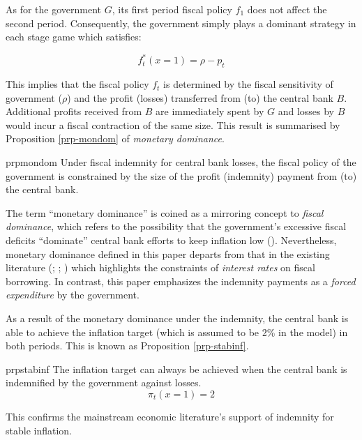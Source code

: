 \documentclass[
  a4paper,
  abstract=true]{scrartcl}
\theoremstyle{definition}
\begin{document}
As for the government \(G\), its first period fiscal policy \(f_1\) does
not affect the second period. Consequently, the government simply plays
a dominant strategy in each stage game which satisfies:

\[
f_t^*(x=1)=\rho-p_t
\]

This implies that the fiscal policy \(f_t\) is determined by the fiscal
sensitivity of government (\(\rho\)) and the profit (losses) transferred
from (to) the central bank \(B\). Additional profits received from \(B\)
are immediately spent by \(G\) and losses by \(B\) would incur a fiscal
contraction of the same size. This result is summarised by Proposition
\ref{prp-mondom} of \emph{monetary dominance}.

\begin{restatable}{prp}{mondom}
\label{prp-mondom}
Under fiscal indemnity for central bank losses, the fiscal policy of the government is constrained by the size of the profit (indemnity) payment from (to) the central bank.
\end{restatable}

The term ``monetary dominance'' is coined as a mirroring concept to
\emph{fiscal dominance}, which refers to the possibility that the
government's excessive fiscal deficits ``dominate'' central bank efforts
to keep inflation low ().
Nevertheless, monetary dominance defined in this paper departs from that
in the existing literature (;
;
) which
highlights the constraints of \emph{interest rates} on fiscal borrowing.
In contrast, this paper emphasizes the indemnity payments as a
\emph{forced expenditure} by the government.

As a result of the monetary dominance under the indemnity, the central
bank is able to achieve the inflation target (which is assumed to be 2\%
in the model) in both periods. This is known as Proposition
\ref{prp-stabinf}.

\begin{restatable}{prp}{stabinf}
\label{prp-stabinf}
The inflation target can always be achieved when the central bank is indemnified by the government against losses.
$$
\pi_t(x=1)=2
$$
\end{restatable}

This confirms the mainstream economic literature's support of indemnity
for stable inflation.
\end{document}
